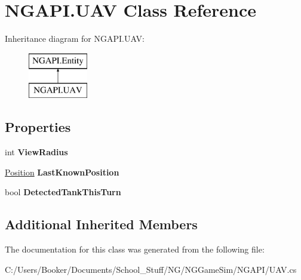 \hypertarget{class_n_g_a_p_i_1_1_u_a_v}{}\section{N\+G\+A\+P\+I.\+U\+AV Class Reference}
\label{class_n_g_a_p_i_1_1_u_a_v}
Inheritance diagram for N\+G\+A\+P\+I.\+U\+AV\+:\begin{figure}[H]
\begin{center}
\leavevmode
\includegraphics[height=2.000000cm]{class_n_g_a_p_i_1_1_u_a_v}
\end{center}
\end{figure}
\subsection*{Properties}
\begin{DoxyCompactItemize}
\item 
\mbox{\label{class_n_g_a_p_i_1_1_u_a_v_acbc1217e6b607e73b3df3c677e759ba3}} 
int {\bfseries View\+Radius}
\item 
\mbox{\label{class_n_g_a_p_i_1_1_u_a_v_a1be03afd94f51576147a624a016da71a}} 
\hyperlink{struct_n_g_a_p_i_1_1_position}{Position} {\bfseries Last\+Known\+Position}
\item 
\mbox{\label{class_n_g_a_p_i_1_1_u_a_v_aa2f695746746e780999eac3a13245ed7}} 
bool {\bfseries Detected\+Tank\+This\+Turn}
\end{DoxyCompactItemize}
\subsection*{Additional Inherited Members}


The documentation for this class was generated from the following file\+:\begin{DoxyCompactItemize}
\item 
C\+:/\+Users/\+Booker/\+Documents/\+School\+\_\+\+Stuff/\+N\+G/\+N\+G\+Game\+Sim/\+N\+G\+A\+P\+I/U\+A\+V.\+cs\end{DoxyCompactItemize}
